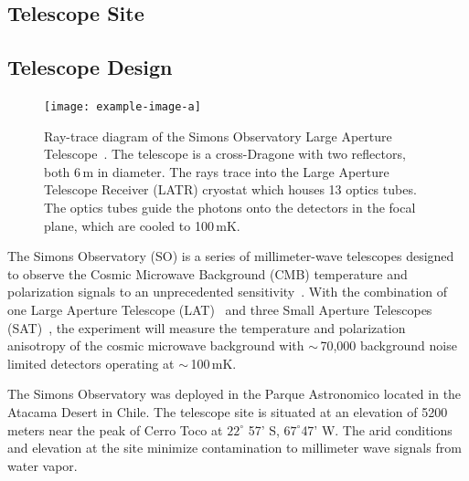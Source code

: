 \subsection{Telescope Site}

\subsection{Telescope Design}

\begin{figure}[t]
    \centering
    \texttt{[image: example-image-a]}
    \caption{Ray-trace diagram of the Simons Observatory Large Aperture Telescope~\cite{XX}.  The telescope is a cross-Dragone with two reflectors, both 6\,m in diameter.  The rays trace into the Large Aperture Telescope Receiver (LATR) cryostat which houses 13 optics tubes.  The optics tubes guide the photons onto the detectors in the focal plane, which are cooled to 100\,mK.}
    \label{fig:so_inst}
\end{figure}

The Simons Observatory (SO) is a series of millimeter-wave telescopes designed to observe the Cosmic Microwave Background (CMB) temperature and polarization signals to an unprecedented sensitivity~\cite{gali18, so19}. With the combination of one Large Aperture Telescope (LAT)~\cite{xu/etal:2020c, zhu18, orlo18, coppi/etal:2018} and three Small Aperture Telescopes (SAT)~\cite{ali20}, the experiment will measure the temperature and polarization anisotropy of the cosmic microwave background with $\sim$\,70,000 background noise limited detectors operating at $\sim$\,100\,mK. 

The Simons Observatory was deployed in the Parque Astronomico located in the Atacama Desert in Chile. The telescope site is situated at an elevation of 5200 meters near the peak of Cerro Toco at $22 ^\circ$ 57' S, $67^\circ$47' W. The arid conditions and elevation at the site minimize contamination to millimeter wave signals from water vapor. 

